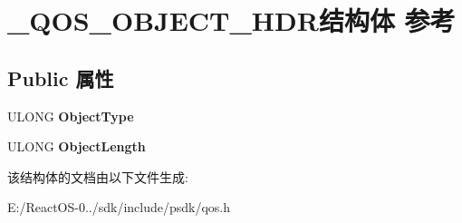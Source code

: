 \hypertarget{struct___q_o_s___o_b_j_e_c_t___h_d_r}{}\section{\+\_\+\+Q\+O\+S\+\_\+\+O\+B\+J\+E\+C\+T\+\_\+\+H\+D\+R结构体 参考}
\label{struct___q_o_s___o_b_j_e_c_t___h_d_r}
\subsection*{Public 属性}
\begin{DoxyCompactItemize}
\item 
\mbox{\label{struct___q_o_s___o_b_j_e_c_t___h_d_r_adc430e56ca8b39ff5dcf17bb7a4b42f1}} 
U\+L\+O\+NG {\bfseries Object\+Type}
\item 
\mbox{\label{struct___q_o_s___o_b_j_e_c_t___h_d_r_ab4ffcaf7d0e1c25fedde171ed2879c8b}} 
U\+L\+O\+NG {\bfseries Object\+Length}
\end{DoxyCompactItemize}


该结构体的文档由以下文件生成\+:\begin{DoxyCompactItemize}
\item 
E\+:/\+React\+O\+S-\/0../sdk/include/psdk/qos.\+h\end{DoxyCompactItemize}
